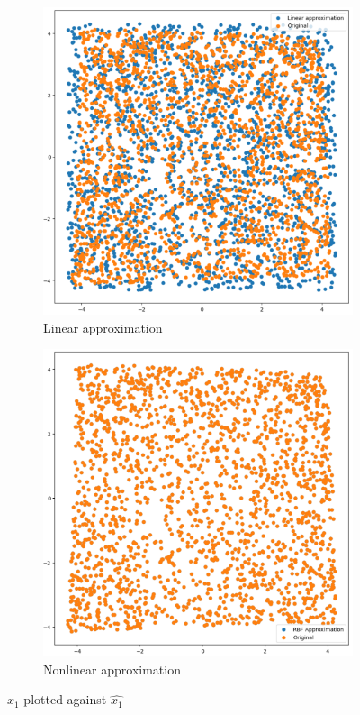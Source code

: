 \begin{figure}[H]
\centering
    \begin{subfigure}{0.45\textwidth}
        \includegraphics[width=\linewidth]{images/5_3_1_lin-approx.png}
        \caption{Linear approximation}
        \label{fig:5-3-1a}
    \end{subfigure}
    \begin{subfigure}{0.45\textwidth}
        \includegraphics[width=\linewidth]{images/5_3_2_nonlin-approx.png}
        \caption{Nonlinear approximation}
        \label{fig:5-3-1b}
    \end{subfigure}
    \caption{$x_1$ plotted against $\hat{x_1}$}
    \label{fig:5-3-1}
\end{figure}

